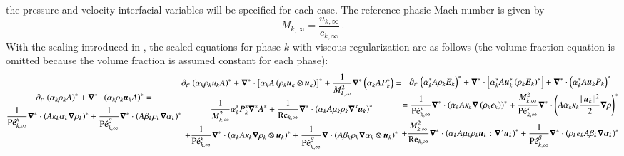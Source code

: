 the pressure and velocity interfacial variables will be specified for each case. The reference phasic Mach number is given by
%
\begin{equation}
M_{k,\infty} = \frac{u_{k,\infty}}{c_{k,\infty}} \,.
\end{equation}
%
With the scaling introduced in , the scaled equations for phase $k$ with viscous regularization are as follows 
(the volume fraction equation is omitted because the volume fraction is assumed constant for each phase): %
% 
\begin{subequations}\label{eq:sev_equ_case_one_scaled}
%
\begin{multline}\label{eq:sev_equ-with-diss-terms-cont_case_one_scaled}
\partial_{t^*} \left( \alpha_k \rho_k A \right)^* + \grad^* \cdot \left( \alpha_k \rho_k \mbold u_k A \right)^* = \\ \frac{1}{\Pe^\kappa_{k,\infty}}\grad^* \cdot \left(A \kappa_k \alpha_k \grad \rho_k \right)^* +
\frac{1}{\Pe_{k,\infty}^\beta} \grad^* \cdot \left( A \beta_k \rho_k \grad \alpha_k \right)^*
\end{multline}
%
\begin{multline}\label{eq:sev_equ-with-diss-terms-mom_case_one_scaled}
\partial_{t^*} \left( \alpha_k \rho_k u_k A \right)^* + \grad^* \cdot \left[ \alpha_k A \left( \rho_k \mbold u_k \otimes \mbold u_k\right)\right]^* + \frac{1}{M^2_{k,\infty}}\grad^* \left( \alpha_k A P_k^* \right) = \\
  \frac{1}{M^2_{k,\infty}} \alpha_k^* P^*_k \grad^* A^*  
+ \frac{1}{\Re_{k,\infty}}\grad^* \cdot \left( \alpha_k A \mu_k \rho_k \grad^s \mbold u_k \right)^* \\ 
+ \frac{1}{\Pe_{k,\infty}^\kappa} \grad^* \cdot\left( \alpha_k A \kappa_k \grad \rho_k \otimes \mbold u_k \right)^* 
+ \frac{1}{\Pe_{k,\infty}^\beta} \grad \cdot \left( A \beta_k \rho_k \grad \alpha_k \otimes \mbold u_k \right)^*
\end{multline}
%
\begin{multline}\label{eq:sev_equ-with-diss-terms-ener_case_one_scaled}
\partial_{t^*} \left( \alpha_k^* A \rho_k E_k \right)^* + \grad^* \cdot \left[ \alpha_k^* A \mbold u_k^*  \left( \rho_k E_k \right)^* \right] +  \grad^* \cdot \left(\alpha_k^* A \mbold u_k P_k \right)^*  \\ =
\frac{1}{\Pe_{k,\infty}^\kappa} \grad^* \cdot \left( \alpha_k A \kappa_k \grad \left( \rho_k e_k \right) \right)^* 
+ \frac{M^2_{k,\infty}}{\Pe_{k,\infty}^\kappa} \grad^* \cdot \left( A\alpha_k \kappa_k \frac{||\mbold u_k||^2}{2} \grad \rho \right)^*  \\
+ \frac{M^2_{k,\infty}}{\Re_{k,\infty}} \grad^* \cdot \left( \alpha_k A \mu_k \rho_k \mbold u_k : \grad^s \mbold u_k\right)^* 
+ \frac{1}{\Pe_{k,\infty}^\beta } \grad^*\cdot \left( \rho_k e_k A \beta_k \grad \alpha_k \right)^*
\end{multline}
%
\end{subequations}
